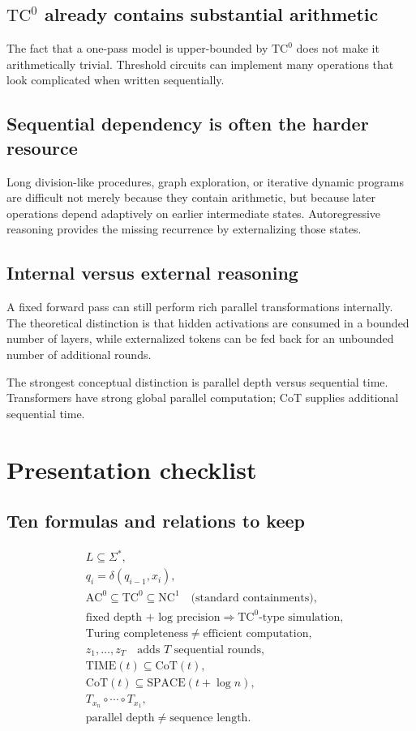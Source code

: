 \documentclass[11pt,a4paper,oneside,openany]{memoir}
\theoremstyle{definition}
\begin{document}
\section{$\mathrm{TC}^0$ already contains substantial arithmetic}
The fact that a one-pass model is upper-bounded by $\mathrm{TC}^0$ does not make it arithmetically trivial.  Threshold circuits can implement many operations that look complicated when written sequentially.

\section{Sequential dependency is often the harder resource}
Long division-like procedures, graph exploration, or iterative dynamic programs are difficult not merely because they contain arithmetic, but because later operations depend adaptively on earlier intermediate states.  Autoregressive reasoning provides the missing recurrence by externalizing those states.

\section{Internal versus external reasoning}
A fixed forward pass can still perform rich parallel transformations internally.  The theoretical distinction is that hidden activations are consumed in a bounded number of layers, while externalized tokens can be fed back for an unbounded number of additional rounds.

\begin{presentbox}
The strongest conceptual distinction is parallel depth versus sequential time.  Transformers have strong global parallel computation; CoT supplies additional sequential time.
\end{presentbox}

\chapter{Presentation checklist}
\section{Ten formulas and relations to keep}
\begin{align*}
&L\subseteq\Sigma^*,\\
&q_i=\delta(q_{i-1},x_i),\\
&\mathrm{AC}^0\subseteq\mathrm{TC}^0\subseteq\mathrm{NC}^1\quad\text{(standard containments)},\\
&\text{fixed depth + log precision}\Rightarrow \mathrm{TC}^0\text{-type simulation},\\
&\text{Turing completeness}\neq\text{efficient computation},\\
&z_1,\ldots,z_T\quad\text{adds }T\text{ sequential rounds},\\
&\mathrm{TIME}(t)\subseteq\mathrm{CoT}(t),\\
&\mathrm{CoT}(t)\subseteq\mathrm{SPACE}(t+\log n),\\
&T_{x_n}\circ\cdots\circ T_{x_1},\\
&\text{parallel depth}\neq\text{sequence length}.
\end{align*}
\end{document}
